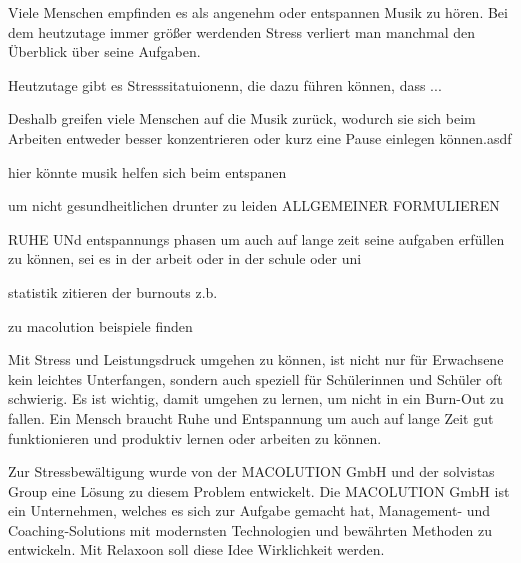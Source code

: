 
Viele Menschen empfinden es als angenehm oder entspannen Musik zu hören. Bei dem heutzutage immer größer
werdenden Stress verliert man manchmal den Überblick über seine Aufgaben.

Heutzutage gibt es Stresssitatuionenn, die dazu führen können, dass ...

Deshalb greifen viele Menschen
auf die Musik zurück, wodurch sie sich beim Arbeiten entweder besser konzentrieren oder kurz
eine Pause einlegen können.asdf

hier könnte musik helfen sich beim entspanen

um nicht gesundheitlichen drunter zu leiden ALLGEMEINER FORMULIEREN

RUHE UNd entspannungs phasen um auch auf lange zeit seine aufgaben erfüllen zu können, sei es
in der arbeit oder in der schule oder uni

statistik zitieren der burnouts z.b.

zu macolution beispiele finden

Mit Stress und Leistungsdruck umgehen zu können, ist nicht nur für Erwachsene kein leichtes Unterfangen,
sondern auch speziell für Schülerinnen und Schüler oft schwierig. Es ist wichtig, damit umgehen zu lernen,
um nicht in ein Burn-Out zu fallen. Ein Mensch braucht Ruhe und Entspannung um auch auf lange Zeit gut
funktionieren und produktiv lernen oder arbeiten zu können.

Zur Stressbewältigung wurde von der MACOLUTION GmbH und der solvistas Group eine Lösung zu diesem
Problem entwickelt. Die MACOLUTION GmbH ist ein Unternehmen, welches es sich zur Aufgabe gemacht hat,
Management- und Coaching-Solutions mit modernsten Technologien und bewährten Methoden zu entwickeln.
\cite{MACOLUTION}
Mit Relaxoon soll diese Idee Wirklichkeit werden.

